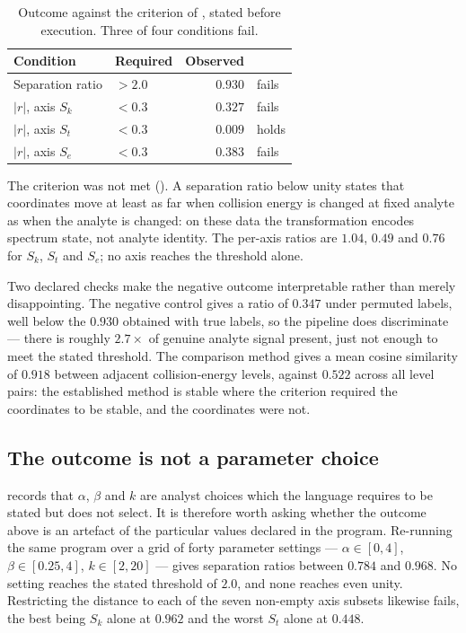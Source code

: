 \documentclass[11pt,twocolumn,a4paper]{article}
\theoremstyle{ssthm}
\theoremstyle{definition}
\theoremstyle{remark}
\begin{document}
\begin{table}[htbp]
\centering
\small
\caption{Outcome against the criterion of , stated
before execution. Three of four conditions fail.}
\label{tab:outcome}
\begin{tabular}{@{}llrl@{}}
\toprule
\textbf{Condition} & \textbf{Required} & \textbf{Observed} & \\
\midrule
Separation ratio            & $>2.0$  & $0.930$  & fails \\
$\lvert r\rvert$, axis $S_k$ & $<0.3$  & $0.327$  & fails \\
$\lvert r\rvert$, axis $S_t$ & $<0.3$  & $0.009$  & holds \\
$\lvert r\rvert$, axis $S_e$ & $<0.3$  & $0.383$  & fails \\
\bottomrule
\end{tabular}
\end{table}

The criterion was not met (). A separation ratio below
unity states that coordinates move at least as far when collision energy
is changed at fixed analyte as when the analyte is changed: on these
data the transformation encodes spectrum state, not analyte identity.
The per-axis ratios are $1.04$, $0.49$ and $0.76$ for $S_k$, $S_t$ and
$S_e$; no axis reaches the threshold alone.

Two declared checks make the negative outcome interpretable rather than
merely disappointing. The negative control gives a ratio of $0.347$
under permuted labels, well below the $0.930$ obtained with true labels,
so the pipeline does discriminate --- there is roughly $2.7\times$ of
genuine analyte signal present, just not enough to meet the stated
threshold. The comparison method gives a mean cosine similarity of
$0.918$ between adjacent collision-energy levels, against $0.522$ across
all level pairs: the established method is stable where the criterion
required the coordinates to be stable, and the coordinates were not.

\subsection{The outcome is not a parameter choice}

 records that $\alpha$, $\beta$ and $k$ are
analyst choices which the language requires to be stated but does not
select. It is therefore worth asking whether the outcome above is an
artefact of the particular values declared in the program. Re-running the
same program over a grid of forty parameter settings --- $\alpha \in
[0,4]$, $\beta \in [0.25,4]$, $k \in [2,20]$ --- gives separation ratios
between $0.784$ and $0.968$. No setting reaches the stated threshold of
$2.0$, and none reaches even unity. Restricting the distance to each of
the seven non-empty axis subsets likewise fails, the best being $S_k$
alone at $0.962$ and the worst $S_t$ alone at $0.448$.
\end{document}

